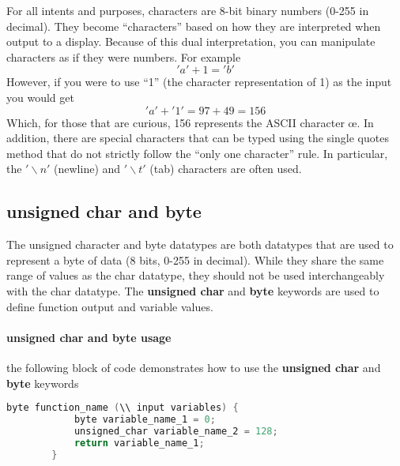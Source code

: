     \begin{kaobox}[frametitle=Aside: Some quirks with characters]
        For all intents and purposes, characters are 8-bit binary numbers (0-255 in decimal). They become \enquote{characters} based on how they are interpreted when output to
        a display. Because of this dual interpretation, you can manipulate characters as if they were numbers. For example
        \begin{equation*}
            'a' + 1 = 'b'
        \end{equation*}
        However, if you were to use \enquote{1} (the character representation of 1) as the input you would get
        \begin{equation*}
            'a' + '1' = 97 + 49 = 156
        \end{equation*} 
        Which, for those that are curious, 156 represents the ASCII character \oe. In addition, there are special characters that can be typed using the single quotes 
        method that do not strictly follow the \enquote{only one character} rule. In particular, the $'\backslash n'$ (newline) and $'\backslash t'$ (tab) characters are often used.
    \end{kaobox}

    \subsection{unsigned char and byte}
    The unsigned character and byte datatypes are both datatypes that are used to represent a byte of data (8 bits, 0-255 in decimal). While they share the same range of values
    as the char datatype, they should not be used interchangeably with the char datatype. The \textbf{unsigned char} and \textbf{byte} keywords are used to define function output
    and variable values.
    \paragraph*{unsigned char and byte usage} the following block of code demonstrates how to use the \textbf{unsigned char} and \textbf{byte} keywords
    \begin{lstlisting}[linewidth=1.5\textwidth, language=C++]
        byte function_name (\\ input variables) {
            byte variable_name_1 = 0;
            unsigned_char variable_name_2 = 128;
            return variable_name_1;
        }\end{lstlisting}